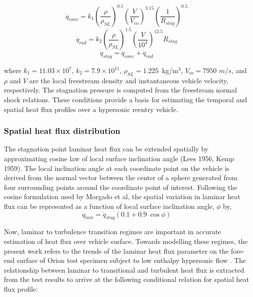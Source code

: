 \documentclass[%
 aip,
 amsmath,amssymb,
preprint,%
]{revtex4-1}
\begin{document}
\begin{equation}
    \dot{q}_{conv} = k_1 \left(\frac {\rho}{\rho_{SL}}\right)^{0.5} \left(\frac {V}{V_{co}}\right)^{3.15} \left(\frac {1}{R_{stag}}\right)^{0.5}
    \label{heat_flux_conv}
\end{equation}
\begin{equation}
    \dot{q}_{rad} = k_2 \left(\frac {\rho}{\rho_{SL}}\right)^{1.5} \left(\frac {V}{10^{4}}\right)^{12.5} R_{stag}
    \label{heat_flux_rad}
\end{equation}
\begin{equation}
    \dot{q}_{stag} = \dot{q}_{conv} + \dot{q}_{rad}
    \label{heat_flux}
\end{equation}

where $k_1 = 11.03\times 10^{7}$, $k_2 = 7.9\times 10^{11}$, $\rho_{SL} = 1.225$~kg/m$^{3}$, $V_{co} = 7950$ $m/s$, and $\rho$ and $V$ are the local freestream density and instantaneous vehicle velocity, respectively. The stagnation pressure is computed from the freestream normal shock relations. These conditions provide a basis for estimating the temporal and spatial heat flux profiles over a hypersonic reentry vehicle.

\subsubsection{Spatial heat flux distribution}
The stagnation point laminar heat flux can be extended spatially by approximating cosine law of local surface inclination angle (Lees 1956, Kemp 1959). The local inclination angle at each coordinate point on the vehicle is derived from the normal vector between the center of a sphere generated from four surrounding points around the coordinate point of interest. Following the cosine formulation used by Morgado et al, the spatial variation in laminar heat flux can be represented as a function of local surface inclination angle, $\phi$ by,
\begin{equation}
    \dot{q}_{lam} = \dot{q}_{stag}\left(0.1+0.9~\cos\phi\right)
    \label{cosine_law}
\end{equation}

Now, laminar to turbulence transition regimes are important in accurate estimation of heat flux over vehicle surface. Towards modelling these regimes, the present work refers to the trends of the laminar heat flux parameter on the fore-end surface of Orion test specimen subject to low enthalpy hypersonic flow \citep{hollis_aeroheating_2009}. The relationship between laminar to transitional and turbulent heat flux is extracted from the test results to arrive at the following conditional relation for spatial heat flux profile:
\end{document}
